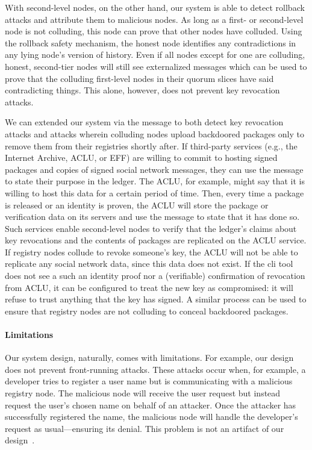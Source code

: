 With second-level nodes, on the other hand, our system is able to detect
rollback attacks and attribute them to malicious nodes. As long as a first- or
second-level node is not colluding, this node can prove that other nodes have
colluded. Using the rollback safety mechanism, the honest node identifies any
contradictions in any lying node's version of history. Even if all nodes except
for one are colluding, honest, second-tier nodes will still see externalized
messages which can be used to prove that the colluding first-level nodes in
their quorum slices have said contradicting things.
This alone, however, does not prevent key revocation attacks.

We can extended our system via the \extensible message to both detect key
revocation attacks and attacks wherein colluding nodes upload backdoored
packages only to remove them from their registries shortly after.
If third-party services (e.g., the Internet Archive, ACLU, or EFF) are willing to commit to hosting signed
packages and copies of signed social network messages, they can use the \extensible message
to state their purpose in the ledger. The ACLU, for example, might say that it is willing
to host this data for a certain period of time. Then, every time a package is
released or an identity is proven, the ACLU will store the package
or verification data on its servers and use the \extensible message to state that it has done
so. Such services enable second-level nodes to verify 
that the ledger's claims about key revocations and the contents of packages are
replicated on the ACLU service. If registry nodes collude to
revoke someone's key, the ACLU will not be able to replicate any
social network data, since this data does not exist. If the \spam{} cli tool does
not see a such an identity proof nor a (verifiable) confirmation of
revocation from ACLU, it can be configured to treat the new key
as compromised: it will refuse to trust anything that the key has signed.
A similar process can be used to ensure that registry nodes are not colluding to
conceal backdoored packages. 

\paragraph{Limitations}
Our system design, naturally, comes with limitations.
%
For example, our design does not prevent front-running attacks. These attacks
occur when, for example, a developer tries to register a user name but
is communicating with a malicious registry node. The malicious node
will receive the user request but instead request the user's chosen name
on behalf of an attacker. 
Once the attacker has successfully registered the name, the malicious node will
handle the developer's request as usual---ensuring its denial.
This problem is not an artifact of our design~\cite{frontrunning}.

